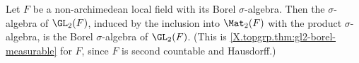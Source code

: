 Let $F$ be a non-archimedean local field with its Borel $\sigma$-algebra. Then the $\sigma$-algebra of $\GL_2(F)$, induced by the inclusion into $\Mat_2(F)$ with the product $\sigma$-algebra, is the Borel $\sigma$-algebra of $\GL_2(F)$. (This is \cref{X.topgrp.thm:gl2-borel-measurable} for $F$, since $F$ is second countable and Hausdorff.)
